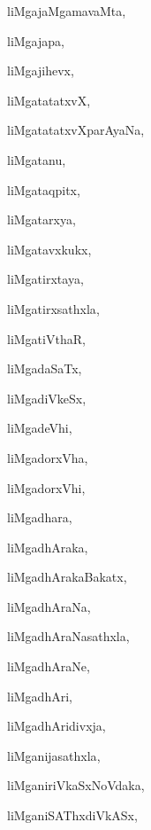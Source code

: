\begin{multicols}{3}
{\noindent
{liMgajaMgamavaMta}, \pageref{liMgajaMgamavaMta}

\noindent
{liMgajapa}, \pageref{liMgajapa}

\noindent
{liMgajihevx}, \pageref{liMgajihevx}

\noindent
{liMgatatatxvX}, \pageref{liMgatatatxvX}

\noindent
{liMgatatatxvXparAyaNa}, \pageref{liMgatatatxvXparAyaNa}

\noindent
{liMgatanu}, \pageref{liMgatanu}

\noindent
{liMgataqpitx}, \pageref{liMgataqpitx}

\noindent
{liMgatarxya}, \pageref{liMgatarxya}

\noindent
{liMgatavxkukx}, \pageref{liMgatavxkukx}

\noindent
{liMgatirxtaya}, \pageref{liMgatirxtaya}

\noindent
{liMgatirxsathxla}, \pageref{liMgatirxsathxla}

\noindent
{liMgatiVthaR}, \pageref{liMgatiVthaR}

\noindent
{liMgadaSaTx}, \pageref{liMgadaSaTx}

\noindent
{liMgadiVkeSx}, \pageref{liMgadiVkeSx}

\noindent
{liMgadeVhi}, \pageref{liMgadeVhi}

\noindent
{liMgadorxVha}, \pageref{liMgadorxVha}

\noindent
{liMgadorxVhi}, \pageref{liMgadorxVhi}

\noindent
{liMgadhara}, \pageref{liMgadhara}

\noindent
{liMgadhAraka}, \pageref{liMgadhAraka}

\noindent
{liMgadhArakaBakatx}, \pageref{liMgadhArakaBakatx}

\noindent
{liMgadhAraNa}, \pageref{liMgadhAraNa}

\noindent
{liMgadhAraNasathxla}, \pageref{liMgadhAraNasathxla}

\noindent
{liMgadhAraNe}, \pageref{liMgadhAraNe}

\noindent
{liMgadhAri}, \pageref{liMgadhAri}

\noindent
{liMgadhAridivxja}, \pageref{liMgadhAridivxja}

\noindent
{liMganijasathxla}, \pageref{liMganijasathxla}

\noindent
{liMganiriVkaSxNoVdaka}, \pageref{liMganiriVkaSxNoVdaka}

\noindent
{liMganiSAThxdiVkASx}, \pageref{liMganiSAThxdiVkASx}

}
\end{multicols}
